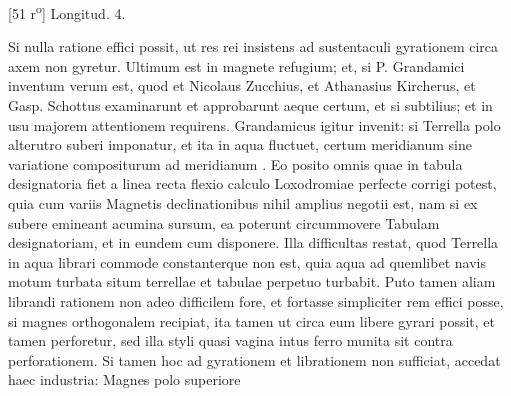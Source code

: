 \begin{center}[51 r\textsuperscript{o}] Longitud. 4.\end{center}\pend \vspace{1.0ex} \pstart Si nulla ratione effici possit, ut res rei insistens ad sustentaculi gyrationem circa axem non gyretur. Ultimum est in magnete\protect{} refugium; et, si P. Grandamici \protect{} inventum verum est, quod et Nicolaus Zucchius\protect{}, et Athanasius Kircherus\protect{}, et Gasp. Schottus\protect{} examinarunt et approbarunt aeque certum, et si subtilius; et in usu majorem attentionem requirens. Grandamicus\protect{} igitur invenit: si Terrella polo\protect{} alterutro suberi imponatur, et ita in aqua fluctuet, certum meridianum\protect{} sine variatione compositurum ad meridianum\protect{} . Eo posito omnis quae in tabula designatoria fiet a linea recta flexio calculo Loxodromiae\protect{} perfecte corrigi potest, quia cum variis Magnetis\protect{} declinationibus nihil amplius negotii est, nam si ex subere  emineant acumina sursum, ea poterunt circummovere Tabulam designatoriam, et in eundem cum  disponere. Illa difficultas restat, quod Terrella in aqua  librari commode constanterque non est, quia aqua ad quemlibet navis\protect{} motum turbata situm terrellae et tabulae perpetuo turbabit. Puto tamen aliam librandi rationem non adeo difficilem fore, et fortasse simpliciter rem effici posse, si magnes\protect{}  orthogonalem recipiat, ita tamen ut circa eum libere gyrari possit, et tamen  perforetur, sed illa styli quasi vagina intus ferro munita sit contra perforationem. Si tamen hoc ad gyrationem et librationem non sufficiat, accedat haec industria: Magnes\protect{} polo\protect{} superiore 